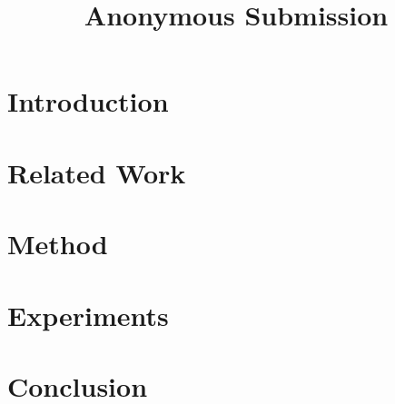 \documentclass[conference]{IEEEtran}
\begin{document}
\title{Anonymous Submission}

\author{}

\maketitle

\begin{abstract}
\end{abstract}

\begin{IEEEkeywords}
\end{IEEEkeywords}

\section{Introduction}
\label{sec:intro}

\section{Related Work}
\label{sec:related_work}

\section{Method}
\label{sec:method}

\section{Experiments}
\label{sec:experiments}

\section{Conclusion}
\label{sec:conclusion}



\end{document}

